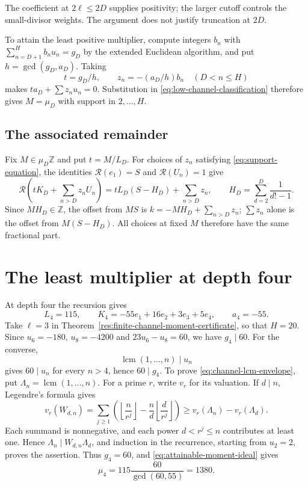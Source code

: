 \documentclass[11pt]{article}
\begin{document}
The coefficient at $2\ell\le2D$ supplies positivity; the larger cutoff
controls the small-divisor weights. The argument does not justify
truncation at $2D$.

To attain the least positive multiplier, compute integers $b_n$ with
$\sum_{n=D+1}^H b_nu_n=g_D$ by the extended Euclidean algorithm, and put
$h=\gcd(g_D,a_D)$. Taking
\[
 t=g_D/h,\qquad z_n=-(a_D/h)b_n\quad(D<n\le H)
\]
makes $ta_D+\sum z_nu_n=0$. Substitution in
\eqref{eq:low-channel-classification} therefore gives $M=\mu_D$ with
support in $2,\ldots,H$.

\subsection{The associated remainder}\label{sec:coordinate-remainder}

Fix $M\in\mu_D\mathbb Z$ and put $t=M/L_D$. For choices of $z_n$
satisfying \eqref{eq:support-equation}, the identities
$\mathcal R(e_1)=S$ and $\mathcal R(U_n)=1$ give
\begin{equation}
 \mathcal R\left(tK_D+\sum_{n>D}z_nU_n\right)
 =tL_D(S-H_D)+\sum_{n>D}z_n,
 \qquad H_D=\sum_{d=2}^D\frac1{d!-1}.
 \label{eq:residual-transparency}
\end{equation}
Since $MH_D\in\mathbb Z$, the offset from $MS$ is
$k=-MH_D+\sum_{n>D}z_n$; $\sum z_n$ alone is the offset from
$M(S-H_D)$. All choices at fixed $M$ therefore have the same
fractional part.

\section{The least multiplier at depth four}\label{sec:depth-four}

At depth four the recursion gives
\[
 L_4=115,\qquad
 K_4=-55e_1+16e_2+3e_3+5e_4,\qquad a_4=-55.
\]
Take $\ell=3$ in Theorem~\ref{res:finite-channel-moment-certificate},
so that $H=20$. Since $u_6=-180$, $u_8=-4200$ and
$23u_6-u_8=60$, we have $g_4\mid60$. For the converse,
\begin{equation}
 \operatorname{lcm}(1,\ldots,n)\mid u_n
 \label{eq:channel-lcm-envelope}
\end{equation}
gives $60\mid u_n$ for every $n>4$, hence $60\mid g_4$.
To prove \eqref{eq:channel-lcm-envelope}, put
$\Lambda_n=\operatorname{lcm}(1,\ldots,n)$. For a prime $r$, write $v_r$ for its valuation. If $d\mid n$,
Legendre's formula gives
\[
 v_r(W_{d,n})=\sum_{j\ge1}\left(
 \left\lfloor\frac n{r^j}\right\rfloor
 -\frac nd\left\lfloor\frac d{r^j}\right\rfloor\right)
 \ge v_r(\Lambda_n)-v_r(\Lambda_d).
\]
Each summand is nonnegative, and each power
$d<r^j\le n$ contributes at least one. Hence
$\Lambda_n\mid W_{d,n}\Lambda_d$, and induction in the recurrence,
starting from $u_2=2$, proves the assertion. Thus $g_4=60$, and
\eqref{eq:attainable-moment-ideal} gives
\[
 \mu_4=115\frac{60}{\gcd(60,55)}=1380.
\]
\end{document}
